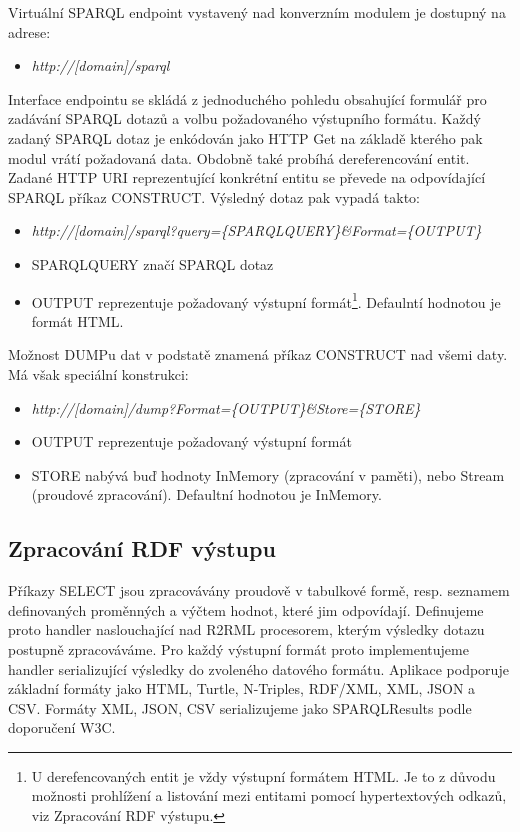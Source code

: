 Virtuální SPARQL endpoint vystavený nad konverzním modulem je dostupný na adrese:

\begin{itemize}
\item \textit{http://[domain]/sparql}
\end{itemize}

Interface endpointu se skládá z jednoduchého pohledu obsahující formulář pro zadávání SPARQL dotazů a volbu požadovaného výstupního formátu. Každý zadaný SPARQL dotaz je enkódován jako HTTP Get na základě kterého pak modul vrátí požadovaná data. Obdobně také probíhá dereferencování entit. Zadané HTTP URI reprezentující konkrétní entitu se převede na odpovídající SPARQL příkaz CONSTRUCT. Výsledný dotaz pak vypadá takto:

\begin{itemize}
\item \textit{http://[domain]/sparql?query=\{SPARQLQUERY\}\&Format=\{OUTPUT\}}
\item SPARQLQUERY značí SPARQL dotaz 
\item OUTPUT reprezentuje požadovaný výstupní formát\footnote{U derefencovaných entit je vždy výstupní formátem HTML. Je to z důvodu možnosti prohlížení a listování mezi entitami pomocí hypertextových odkazů, viz Zpracování RDF výstupu.}. Defaulntí hodnotou je formát HTML.
\end{itemize}

Možnost DUMPu dat v podstatě znamená příkaz CONSTRUCT nad všemi daty. Má však speciální konstrukci:

\begin{itemize}
\item \textit{http://[domain]/dump?Format=\{OUTPUT\}\&Store=\{STORE\}}
\item OUTPUT reprezentuje požadovaný výstupní formát
\item STORE nabývá buď hodnoty InMemory (zpracování v paměti), nebo Stream (proudové zpracování). Defaultní hodnotou je InMemory. 
\end{itemize}

\subsection{Zpracování RDF výstupu}

Příkazy SELECT jsou zpracovávány proudově v tabulkové formě, resp. seznamem definovaných proměnných a výčtem hodnot, které jim odpovídají. Definujeme proto handler naslouchající nad R2RML procesorem, kterým výsledky dotazu postupně zpracováváme. Pro každý výstupní formát proto implementujeme handler serializující výsledky do zvoleného datového formátu. Aplikace podporuje základní formáty jako HTML, Turtle, N-Triples, RDF/XML, XML, JSON a CSV. Formáty XML, JSON, CSV serializujeme jako SPARQLResults podle doporučení W3C\cite{Sparqlresults}.

